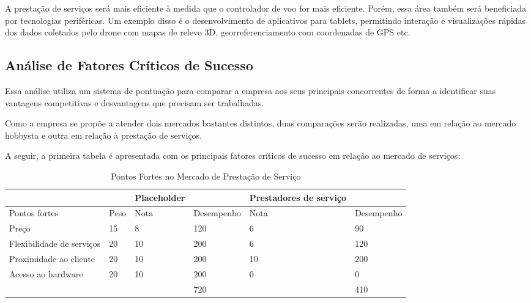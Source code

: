 A prestação de serviços será mais eficiente à medida que o controlador de voo for mais eficiente. Porém, 
essa área também será beneficiada por tecnologias periféricas. Um exemplo disso é o desenvolvimento de 
aplicativos para tablets, permitindo interação e visualizações rápidas dos dados coletados pelo drone com 
mapas de relevo 3D, georreferenciamento com coordenadas de GPS etc.

\subsection{Análise de Fatores Críticos de Sucesso}

Essa análise utiliza um sistema de pontuação para comparar a empresa aos seus principais concorrentes de 
forma a identificar suas vantagens competitivas e desvantagens que precisam ser trabalhadas.

Como a empresa se propõe a atender dois mercados bastantes distintos, duas comparações serão realizadas, 
uma em relação ao mercado hobbysta e outra em relação à prestação de serviços.

A seguir, a primeira tabela é apresentada com os principais fatores críticos de sucesso em relação ao 
mercado de serviços:

\begin{table}[!htbp]
	\centering
	\begin{tabular}{ll|l|l|l|l|}
		\cline{3-3} \cline{5-6}
														& \multicolumn{1}{l|}{}     & Placeholder &            & Prestadores de serviço &            \\ \hline
		\multicolumn{1}{|l|}{Pontos fortes}             & \multicolumn{1}{l|}{Peso} & Nota        & Desempenho & Nota                   & Desempenho \\ \hline
		\multicolumn{1}{|l|}{Preço}                     & \multicolumn{1}{l|}{15}   & 8           & 120        & 6                      & 90         \\ \hline
		\multicolumn{1}{|l|}{Flexibilidade de serviços} & \multicolumn{1}{l|}{20}   & 10          & 200        & 6                      & 120        \\ \hline
		\multicolumn{1}{|l|}{Proximidade ao cliente}    & \multicolumn{1}{l|}{20}   & 10          & 200        & 10                     & 200        \\ \hline
		\multicolumn{1}{|l|}{Acesso ao hardware}        & \multicolumn{1}{l|}{20}   & 10          & 200        & 0                      & 0          \\ \hline
														&                           &             & 720        &                        & 410        \\ \cline{4-4} 	\cline{6-6} 
	\end{tabular}
	\label{pontoForteServico}
	\caption{Pontos Fortes no Mercado de Prestação de Serviço}
\end{table}



